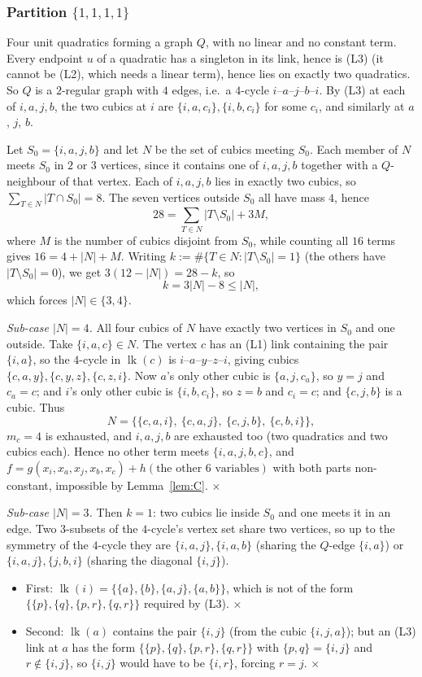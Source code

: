 \documentclass[11pt,reqno]{amsart}
\theoremstyle{plain}
\theoremstyle{definition}
\numberwithin{theorem}{section}
\newcommand{\lk}{\operatorname{lk}}
\begin{document}
\subsubsection*{Partition $\{1,1,1,1\}$} Four unit quadratics forming a graph $Q$, with no
linear and no constant term. Every endpoint $u$ of a quadratic has a singleton in its link,
hence is (L3) (it cannot be (L2), which needs a linear term), hence lies on exactly two
quadratics. So $Q$ is a $2$-regular graph with $4$ edges, i.e.\ a $4$-cycle
$i$--$a$--$j$--$b$--$i$. By (L3) at each of $i,a,j,b$, the two cubics at $i$ are
$\{i,a,c_i\}, \{i,b,c_i\}$ for some $c_i$, and similarly at $a$, $j$, $b$.

Let $S_0 = \{i,a,j,b\}$ and let $N$ be the set of cubics meeting $S_0$. Each member of $N$ meets
$S_0$ in $2$ or $3$ vertices, since it contains one of $i,a,j,b$ together with a $Q$-neighbour of
that vertex. Each of $i,a,j,b$ lies in exactly two cubics, so
$\sum_{T \in N} |T \cap S_0| = 8$. The seven vertices outside $S_0$ all have mass $4$, hence
\[
  28 = \sum_{T \in N} |T \setminus S_0| + 3M ,
\]
where $M$ is the number of cubics disjoint from $S_0$, while counting all $16$ terms gives
$16 = 4 + |N| + M$. Writing $k := \#\{T \in N : |T \setminus S_0| = 1\}$ (the others have
$|T \setminus S_0| = 0$), we get $3(12 - |N|) = 28 - k$, so
\[
  k = 3|N| - 8 \le |N| ,
\]
which forces $|N| \in \{3,4\}$.

\smallskip\noindent\emph{Sub-case $|N| = 4$.} All four cubics of $N$ have exactly two vertices in
$S_0$ and one outside. Take $\{i,a,c\} \in N$. The vertex $c$ has an (L1) link containing the
pair $\{i,a\}$, so the $4$-cycle in $\lk(c)$ is $i$--$a$--$y$--$z$--$i$, giving cubics
$\{c,a,y\}, \{c,y,z\}, \{c,z,i\}$. Now $a$'s only other cubic is $\{a,j,c_a\}$, so $y = j$ and
$c_a = c$; and $i$'s only other cubic is $\{i,b,c_i\}$, so $z = b$ and $c_i = c$; and
$\{c,j,b\}$ is a cubic. Thus
\[
  N = \big\{ \{c,a,i\},\ \{c,a,j\},\ \{c,j,b\},\ \{c,b,i\} \big\},
\]
$m_c = 4$ is exhausted, and $i, a, j, b$ are exhausted too (two quadratics and two cubics each).
Hence no other term meets $\{i,a,j,b,c\}$, and
$f = g(x_i,x_a,x_j,x_b,x_c) + h(\text{the other } 6 \text{ variables})$ with both parts
non-constant, impossible by Lemma~\ref{lem:C}. \hfill$\times$

\smallskip\noindent\emph{Sub-case $|N| = 3$.} Then $k = 1$: two cubics lie inside $S_0$ and one
meets it in an edge. Two $3$-subsets of the $4$-cycle's vertex set share two vertices, so up to
the symmetry of the $4$-cycle they are $\{i,a,j\}, \{i,a,b\}$ (sharing the $Q$-edge $\{i,a\}$) or
$\{i,a,j\}, \{j,b,i\}$ (sharing the diagonal $\{i,j\}$).
\begin{itemize}[leftmargin=1.4em]
  \item First: $\lk(i) = \{\{a\},\{b\},\{a,j\},\{a,b\}\}$, which is not of the form
  $\{\{p\},\{q\},\{p,r\},\{q,r\}\}$ required by (L3). \hfill$\times$
  \item Second: $\lk(a)$ contains the pair $\{i,j\}$ (from the cubic $\{i,j,a\}$); but an (L3)
  link at $a$ has the form $\{\{p\},\{q\},\{p,r\},\{q,r\}\}$ with $\{p,q\} = \{i,j\}$ and
  $r \notin \{i,j\}$, so $\{i,j\}$ would have to be $\{i,r\}$, forcing $r = j$.
  \hfill$\times$
\end{itemize}
\end{document}
